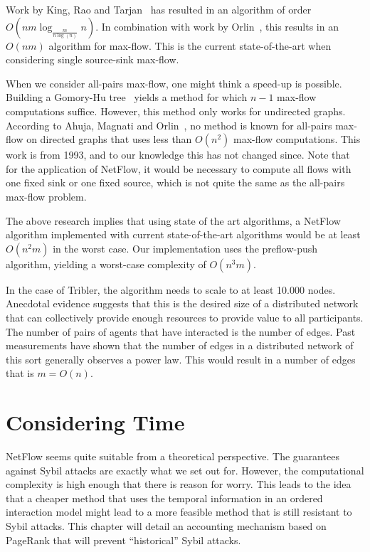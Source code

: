 \documentclass[a4paper,11pt]{book}
\theoremstyle{definition}
\begin{document}
Work by King, Rao and Tarjan~\cite{king1992faster} has resulted in an algorithm of
order $O(nm\log_{\frac{m}{n\log(n)}}n)$. In combination with work by Orlin~\cite{orlin2013max},
this results in an $O(nm)$ algorithm for max-flow. This is the current state-of-the-art
when considering single source-sink max-flow.

When we consider all-pairs max-flow, one might think a speed-up is possible. 
Building a Gomory-Hu tree~\cite{gomory1961multi} yields a method
for which $n-1$ max-flow computations suffice. However, this method only works for undirected graphs.
According to Ahuja, Magnati and Orlin~\cite{ahuja1993network}, no method is known for all-pairs max-flow
on directed graphs that uses less than $O(n^2)$ max-flow computations. This work is from
1993, and to our knowledge this has not changed since. Note that for the application of
NetFlow, it would be necessary to compute all flows with one fixed sink or one fixed source,
which is not quite the same as the all-pairs max-flow problem.

The above research implies that using state of the art algorithms, a NetFlow algorithm
implemented with current state-of-the-art algorithms would be at least $O(n^2m)$ in the
worst case. Our implementation uses the preflow-push algorithm, yielding a worst-case
complexity of $O(n^3m)$. 

In the case of Tribler, the algorithm needs to scale to at least 10.000 nodes. Anecdotal
evidence suggests that this is the desired size of a distributed network that can collectively
provide enough resources to provide value to all participants. The number of pairs of agents
that have interacted is the number of edges. Past measurements have shown that the number
of edges in a distributed network of this sort generally observes a power law. 
This would result in a number of edges that is $m=O(n)$. 




\chapter{Considering Time}
\label{chap:temporal_pr}

NetFlow seems quite suitable from a theoretical perspective. The guarantees against Sybil 
attacks are exactly what we set out for. However, the computational complexity is high
enough that there is reason for worry. This leads to the idea that a cheaper method that uses
the temporal information in an ordered interaction model might lead to a more feasible method
that is still resistant to Sybil attacks. This chapter will detail an accounting mechanism
based on PageRank that will prevent ``historical'' Sybil attacks.
\end{document}
